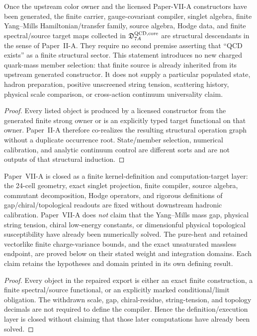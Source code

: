 \documentclass[12pt,a4paper]{article}
\begin{document}
\begin{corollary}
\label{p10:cor:v152-finite-qcd-generated-descendant}
Once the upstream color owner and the licensed Paper-VII-A constructors have been
generated, the finite carrier, gauge-covariant compiler, singlet algebra,
finite Yang--Mills Hamiltonian/transfer family, source algebra, Hodge data, and
finite spectral/source target maps collected in
\(\mathfrak D_{7A}^{\rm QCD,core}\) are structural descendants in the sense
of Paper~II-A.  They require no second premise asserting that ``QCD exists''
as a finite structural sector.  This statement introduces no new charged quark-mass member selection: that
finite source is already inherited from its upstream generated constructor.
It does not supply a particular populated state, hadron preparation, positive
unscreened string tension, scattering history, physical scale comparison, or
cross-action continuum universality claim.
\end{corollary}
\begin{proof}
Every listed object is produced by a licensed constructor from the generated
finite strong owner or is an explicitly typed target functional on that
owner.  Paper~II-A therefore co-realizes the resulting structural operation
graph without a duplicate occurrence root.  State/member selection,
numerical calibration, and analytic continuum control are different sorts and
are not outputs of that structural induction.
\end{proof}

\begin{theorem}
\label{p10:thm:completion-certificate}
Paper~VII-A is closed as a finite kernel-definition and computation-target layer: the 24-cell geometry, exact singlet projection, finite compiler, source algebra, commutant decomposition, Hodge operators, and rigorous definitions of gap/chiral/topological readouts are fixed without downstream hadronic calibration.  Paper~VII-A does \emph{not} claim that the Yang--Mills mass gap, physical string tension, chiral low-energy constants, or dimensionful physical topological susceptibility have already been numerically solved.
The pure-heat and retained vectorlike finite charge-variance bounds, and
the exact unsaturated massless endpoint, are proved below on their
stated weight and integration domains. Each claim retains the hypotheses and domain printed in its own defining result.
\end{theorem}
\begin{proof}
Every object in the repaired export is either an exact finite construction, a finite spectral/source functional, or an explicitly marked conditional/limit obligation.  The withdrawn scale, gap, chiral-residue, string-tension, and topology decimals are not required to define the compiler.  Hence the definition/execution layer is closed without claiming that those later computations have already been solved.
\end{proof}
\end{document}
